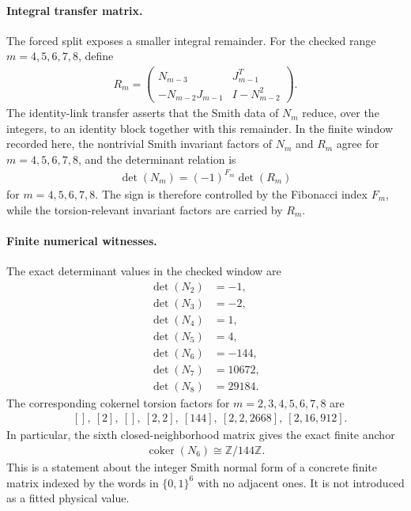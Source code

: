 \paragraph{Integral transfer matrix.}
The forced split exposes a smaller integral remainder. For the checked range $m=4,5,6,7,8$, define
$$
\begin{aligned}
R_m=\begin{pmatrix}
N_{m-3}&J_{m-1}^T\\
-N_{m-2}J_{m-1}&I-N_{m-2}^2
\end{pmatrix}.
\end{aligned}
$$
The identity-link transfer asserts that the Smith data of $N_m$ reduce, over the integers, to an identity block together with this remainder. In the finite window recorded here, the nontrivial Smith invariant factors of $N_m$ and $R_m$ agree for $m=4,5,6,7,8$, and the determinant relation is
$$
\begin{aligned}
\det(N_m)=(-1)^{F_m}\det(R_m)
\end{aligned}
$$
for $m=4,5,6,7,8$. The sign is therefore controlled by the Fibonacci index $F_m$, while the torsion-relevant invariant factors are carried by $R_m$.

\paragraph{Finite numerical witnesses.}
The exact determinant values in the checked window are
$$
\begin{aligned}
\det(N_2)&=-1,\\
\det(N_3)&=-2,\\
\det(N_4)&=1,\\
\det(N_5)&=4,\\
\det(N_6)&=-144,\\
\det(N_7)&=10672,\\
\det(N_8)&=29184.
\end{aligned}
$$
The corresponding cokernel torsion factors for $m=2,3,4,5,6,7,8$ are
$$
\begin{aligned}
&[],\ [2],\ [],\ [2,2],\ [144],\ [2,2,2668],\ [2,16,912].
\end{aligned}
$$
In particular, the sixth closed-neighborhood matrix gives the exact finite anchor
$$
\begin{aligned}
\operatorname{coker}(N_6)\cong \mathbb{Z}/144\mathbb{Z}.
\end{aligned}
$$
This is a statement about the integer Smith normal form of a concrete finite matrix indexed by the words in $\{0,1\}^6$ with no adjacent ones. It is not introduced as a fitted physical value.

